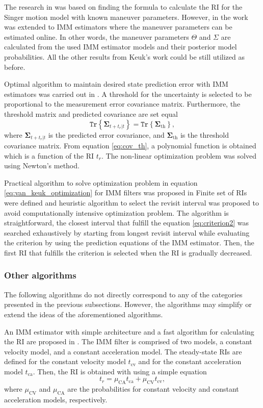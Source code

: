 \documentclass[english, 12pt, a4paper, elec, utf8, a-1b, online]{aaltothesis}
\renewcommand{\vec}[1]{\mathbf{#1}}
\newcommand{\tr}[1]{\texttt{Tr}\left\{ #1 \right\}}
\newcommand{\muca}{\mu_{\text{CA}}}
\newcommand{\mucv}{\mu_{\text{CV}}}
\newcommand{\ri}{t_r}
\begin{document}
The research in \cite{Keuk1975, vanKeuk1993} was based on finding the formula to calculate the RI for the Singer motion model with known maneuver parameters.
However, in \cite{Shin1995} the work was extended to IMM estimators where the maneuver parameters can be estimated online.
In other words, the maneuver parameters $\Theta$ and $\Sigma$ are calculated from the used IMM estimator models and their posterior model probabilities.
All the other results from Keuk's work could be still utilized as before.

Optimal algorithm to maintain desired state prediction error with IMM estimators was carried out in \cite{Watson1993}.
A threshold for the uncertainty is selected to be proportional to the measurement error covariance matrix.
Furthermore, the threshold matrix and predicted covariance are set equal
\begin{equation}\label{eq:cov_th}
    \tr{ \vec{\Sigma}_{t+\ri|t} } = \tr{ \vec{\Sigma}_{\text{th}} },
\end{equation}
where $\vec{\Sigma}_{t+\ri|t}$ is the predicted error covariance, and $\vec{\Sigma}_{\text{th}}$ is the threshold covariance matrix.
From equation \eqref{eq:cov_th}, a polynomial function is obtained which is a function of the RI $\ri$.
The non-linear optimization problem was solved using Newton's method.

Practical algorithm to solve optimization problem in equation \ref{eq:van_keuk_optimization} for IMM filters was proposed in \cite{Daeipour1994} Finite set of RIs were defined and heuristic algorithm to select the revisit interval was proposed to avoid computationally intensive optimization problem.
The algorithm is straightforward, the closest interval that fulfill the equation \eqref{eq:criterion2} was searched exhaustively by starting from longest revisit interval while evaluating the criterion by using the prediction equations of the IMM estimator.
Then, the first RI that fulfills the criterion is selected when the RI is gradually decreased.

\subsubsection{Other algorithms}

The following algorithms do not directly correspond to any of the categories presented in the previous subsections.
However, the algorithms may simplify or extend the ideas of the aforementioned algorithms.

 An IMM estimator with simple architecture and a fast algorithm for calculating the RI are proposed in \cite{Benoudnine2006}.
The IMM filter is comprised of two models, a constant velocity model, and a constant acceleration model.
The steady-state RIs are defined for the constant velocity model $t_\text{cv}$ and for the constant acceleration model $t_\text{ca}$.
Then, the RI is obtained with using a simple equation
\begin{equation}\label{eq:fimm}
    \ri = \muca t_\text{ca} + \mucv t_\text{cv},
\end{equation}
where $\mucv$ and $\muca$ are the probabilities for constant velocity and constant acceleration models, respectively.
\end{document}
